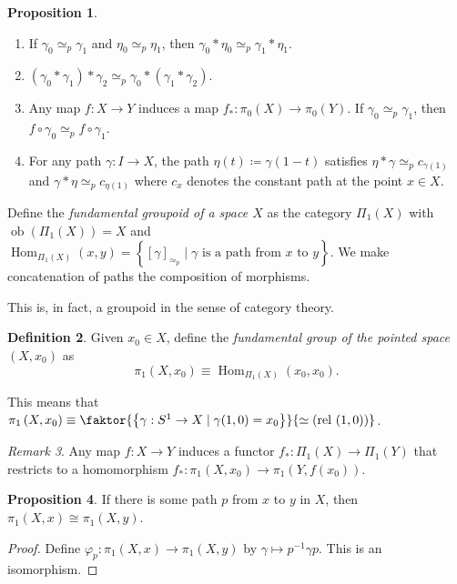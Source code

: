 \documentclass[10pt,letterpaper,cm]{nupset}
\theoremstyle{definition}
\newtheorem{definition}{Definition}[subsection]
\theoremstyle{theorem}
\newtheorem{prop}[definition]{Proposition}
\theoremstyle{remark}
\newtheorem{remark}[definition]{Remark}
\newcommand{\1}{\mathbb{1}}
\newcommand{\0}{\vec 0}
\DeclareMathOperator{\Hom}{Hom}
\DeclareMathOperator{\ob}{ob}
\DeclareMathOperator{\rel}{rel}
\begin{document}
\begin{prop} $ $
\begin{enumerate}
\item If $\gamma_0 \simeq_p \gamma_1$ and $\eta_0 \simeq_p \eta_1$, then $\gamma_0 \ast \eta_0 \simeq_p \gamma_1 \ast \eta_1$.
\item $\left(\gamma_0 \ast \gamma_1\right)\ast \gamma_2 \simeq_p \gamma_0 \ast \left(\gamma_1 \ast \gamma_2\right)$.
\item Any map $f: X \to Y$ induces a map $f_{\ast} : \pi_0(X) \to \pi_0(Y)$. If $\gamma_0 \simeq_p \gamma_1$, then $f\circ \gamma_0 \simeq_p f\circ \gamma_1$.
\item For any path $\gamma : I \to X$, the path $\eta(t) \coloneqq  \gamma(1-t)$ satisfies $\eta \ast \gamma \simeq_p c_{\gamma(1)}$ and $\gamma \ast \eta \simeq_p c_{\eta(1)}$ where $c_x$ denotes the constant path at the point $x\in X$.
\end{enumerate}
\end{prop}


\smallskip

Define the \textit{fundamental groupoid of a space $X$} as the category $\Pi_1(X)$ with $\ob(\Pi_1(X)) = X$ and $\Hom_{\Pi_1(X)}(x,y) = \left\{[\gamma]_{\simeq_p} \mid \gamma \text{ is a path from }x \text{ to }y\right\}$. We make concatenation of paths the composition of morphisms. 



This is, in fact, a groupoid in the sense of category theory.


\begin{definition}
Given $x_0 \in X$, define the \textit{fundamental group of the pointed space $\left(X, x_0\right)$} as $$\pi_1\left(X, x_0\right) \equiv \Hom_{\Pi_1(X)}(x_0,x_0) .$$ 
\end{definition}

This means that $\pi_1\left(X, x_0\right) \equiv  \faktor{\left\{\gamma : S^1 \to X \mid \gamma(1,0) =x_0\right\}}{\simeq (\rel \ (1,0))}$.

\begin{remark}
Any map $f: X \to Y$ induces a functor $f_{\ast} : \Pi_1(X) \to \Pi_1(Y)$ that restricts to a homomorphism $f_{\ast} : \pi_1\left(X, x_0\right) \to \pi_1(Y, f(x_0))$.
\end{remark}

\begin{prop}
If there is some path $p$ from $x$ to $y$ in $X$, then $\pi_1(X, x) \cong \pi_1(X, y)$.
\end{prop}
\begin{proof}
Define $\varphi_p : \pi_1(X, x) \to \pi_1(X, y)$ by $\gamma \mapsto p^{-1} \gamma p$. This is an isomorphism. 
\end{proof}
\end{document}
